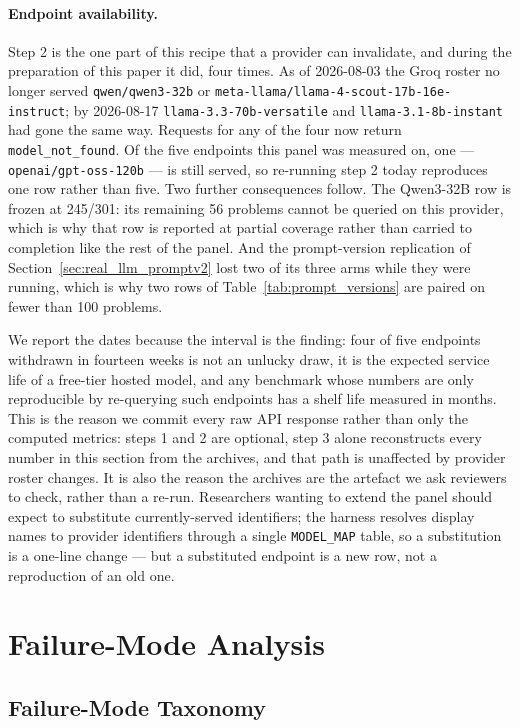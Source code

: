\documentclass{article}
\begin{document}
\paragraph{Endpoint availability.} Step 2 is the one part of this recipe that a provider can invalidate, and during the preparation of this paper it did, four times. As of 2026-08-03 the Groq roster no longer served \texttt{qwen/qwen3-32b} or \texttt{meta-llama/llama-4-scout-17b-16e-instruct}; by 2026-08-17 \texttt{llama-3.3-70b-versatile} and \texttt{llama-3.1-8b-instant} had gone the same way. Requests for any of the four now return \texttt{model\_not\_found}. Of the five endpoints this panel was measured on, one --- \texttt{openai/gpt-oss-120b} --- is still served, so re-running step 2 today reproduces one row rather than five. Two further consequences follow. The Qwen3-32B row is frozen at 245/301: its remaining 56 problems cannot be queried on this provider, which is why that row is reported at partial coverage rather than carried to completion like the rest of the panel. And the prompt-version replication of Section~\ref{sec:real_llm_promptv2} lost two of its three arms while they were running, which is why two rows of Table~\ref{tab:prompt_versions} are paired on fewer than 100 problems.

We report the dates because the interval is the finding: four of five endpoints withdrawn in fourteen weeks is not an unlucky draw, it is the expected service life of a free-tier hosted model, and any benchmark whose numbers are only reproducible by re-querying such endpoints has a shelf life measured in months. This is the reason we commit every raw API response rather than only the computed metrics: steps 1 and 2 are optional, step 3 alone reconstructs every number in this section from the archives, and that path is unaffected by provider roster changes. It is also the reason the archives are the artefact we ask reviewers to check, rather than a re-run. Researchers wanting to extend the panel should expect to substitute currently-served identifiers; the harness resolves display names to provider identifiers through a single \texttt{MODEL\_MAP} table, so a substitution is a one-line change --- but a substituted endpoint is a new row, not a reproduction of an old one.


\section{Failure-Mode Analysis}
\label{sec:analysis}

\subsection{Failure-Mode Taxonomy}
\label{sec:failures}
\end{document}
